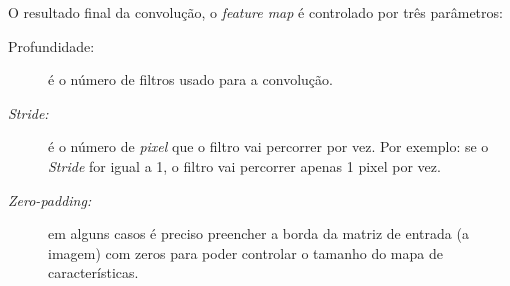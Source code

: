 \begin{figure}[H]
	\centering
\end{figure}

O resultado final da convolução, o \textit{feature map} é controlado por três parâmetros:
\begin{description}
    \item[Profundidade:] é o número de filtros usado para a convolução.
    \item[\textit{Stride:}] é o número de \textit{pixel} que o filtro vai percorrer por vez. Por exemplo: se o \textit{Stride} for igual a 1, o filtro vai percorrer apenas 1 pixel por vez.
    \item[\textit{Zero-padding:}] em alguns casos é preciso preencher a borda da matriz de entrada (a imagem) com zeros para poder controlar o tamanho do mapa de características. 
\end{description}

